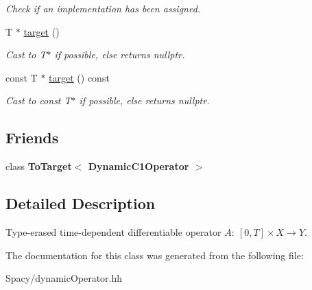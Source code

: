 \begin{DoxyCompactItemize}
\begin{DoxyCompactList}\small\item\em Check if an implementation has been assigned. \end{DoxyCompactList}\item 
\hypertarget{structSpacy_1_1Mixin_1_1ToTarget_a3510786172c63a074eda127276d13392}{}T $\ast$ \hyperlink{structSpacy_1_1Mixin_1_1ToTarget_a3510786172c63a074eda127276d13392}{target} ()\label{structSpacy_1_1Mixin_1_1ToTarget_a3510786172c63a074eda127276d13392}

\begin{DoxyCompactList}\small\item\em Cast to T$\ast$ if possible, else returns nullptr. \end{DoxyCompactList}\item 
\hypertarget{structSpacy_1_1Mixin_1_1ToTarget_a98985b22f6fc98d253c8416c54a5e359}{}const T $\ast$ \hyperlink{structSpacy_1_1Mixin_1_1ToTarget_a98985b22f6fc98d253c8416c54a5e359}{target} () const\label{structSpacy_1_1Mixin_1_1ToTarget_a98985b22f6fc98d253c8416c54a5e359}

\begin{DoxyCompactList}\small\item\em Cast to const T$\ast$ if possible, else returns nullptr. \end{DoxyCompactList}\end{DoxyCompactItemize}
\subsection*{Friends}
\begin{DoxyCompactItemize}
\item 
\hypertarget{classSpacy_1_1DynamicC1Operator_a71fe28220de0b62a43c09bdc18ad85f1}{}class {\bfseries To\+Target$<$ Dynamic\+C1\+Operator $>$}\label{classSpacy_1_1DynamicC1Operator_a71fe28220de0b62a43c09bdc18ad85f1}

\end{DoxyCompactItemize}


\subsection{Detailed Description}
Type-\/erased time-\/dependent differentiable operator $A:\ [0,T] \times X \to Y $. 

The documentation for this class was generated from the following file\+:\begin{DoxyCompactItemize}
\item 
Spacy/dynamic\+Operator.\+hh\end{DoxyCompactItemize}
